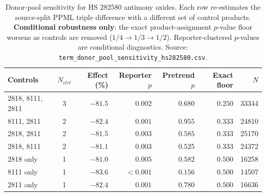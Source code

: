 \begin{table}[H]
\centering
\caption{Donor-pool sensitivity for HS 282580 antimony oxides. Each row
re-estimates the source-split PPML triple difference with a different
set of control products. \textbf{Conditional robustness only}: the
exact product-assignment $p$-value floor worsens as controls are
removed ($1/4 \to 1/3 \to 1/2$). Reporter-clustered $p$-values are
conditional diagnostics. Source:
\texttt{term\_donor\_pool\_sensitivity\_hs282580.csv}.}
\label{tab:donor_sensitivity}
\footnotesize
\begin{tabular}{lcrrrrr}
\toprule
Controls & $N_{ctrl}$ & Effect (\%) & Reporter $p$ & Pretrend $p$ & Exact floor & $N$ \\
\midrule
2818, 8111, 2811 & 3 & $-81.5$ & $0.002$ & $0.680$ & $0.250$ & 33344 \\
8111, 2811 & 2 & $-82.4$ & $0.001$ & $0.955$ & $0.333$ & 24810 \\
2818, 2811 & 2 & $-81.5$ & $0.003$ & $0.585$ & $0.333$ & 25170 \\
2818, 8111 & 2 & $-81.1$ & $0.003$ & $0.525$ & $0.333$ & 24372 \\
2818 only & 1 & $-81.0$ & $0.005$ & $0.582$ & $0.500$ & 16258 \\
8111 only & 1 & $-83.6$ & $<0.001$ & $0.156$ & $0.500$ & 14507 \\
2811 only & 1 & $-82.4$ & $0.001$ & $0.780$ & $0.500$ & 16636 \\
\bottomrule
\end{tabular}
\end{table}
